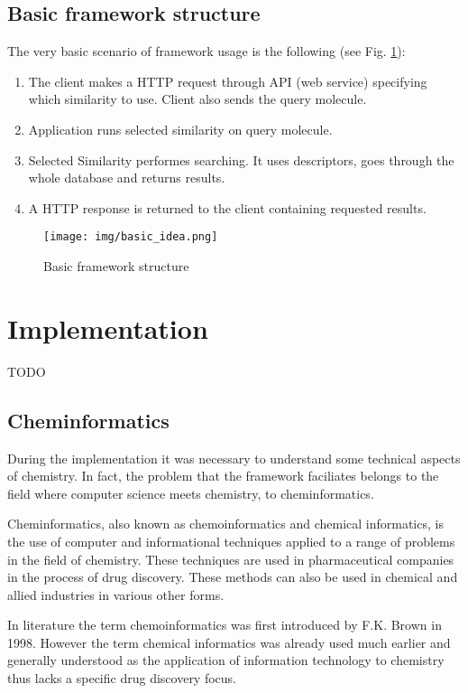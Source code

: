 \documentclass[thesis=M,english]{FITthesis}[2012/10/20]
\begin{document}
\section{Basic framework structure}
The very basic scenario of framework usage is the following (see Fig. \ref{fig:basic_idea}):
\begin{enumerate}
\item The client makes a HTTP request through API (web service) specifying which similarity to use. Client also sends the query molecule.
\item	Application runs selected similarity on query molecule.
\item	Selected Similarity performes searching. It uses descriptors, goes through the whole database and returns results.
\item	A HTTP response is returned to the client containing requested results.
\end{enumerate}

\begin{figure}
  \centering
  \texttt{[image: img/basic\_idea.png]}
  \caption{Basic framework structure}
  \label{fig:basic_idea}
\end{figure}


\chapter{Implementation}

TODO

\section{Cheminformatics}
During the implementation it was necessary to understand some technical aspects of chemistry. In fact, the problem that the framework faciliates belongs to the field where computer science meets chemistry, to cheminformatics.

Cheminformatics, also known as chemoinformatics and chemical informatics, is the use of computer and informational techniques applied to a range of problems in the field of chemistry. These techniques are used in pharmaceutical companies in the process of drug discovery. These methods can also be used in chemical and allied industries in various other forms. \cite{wiki1}

In literature the term chemoinformatics was first introduced by F.K. Brown in 1998. However the term chemical informatics was already used much earlier and generally understood as the application of information technology to chemistry thus lacks a specific drug discovery focus.\cite{bunin}
\end{document}
